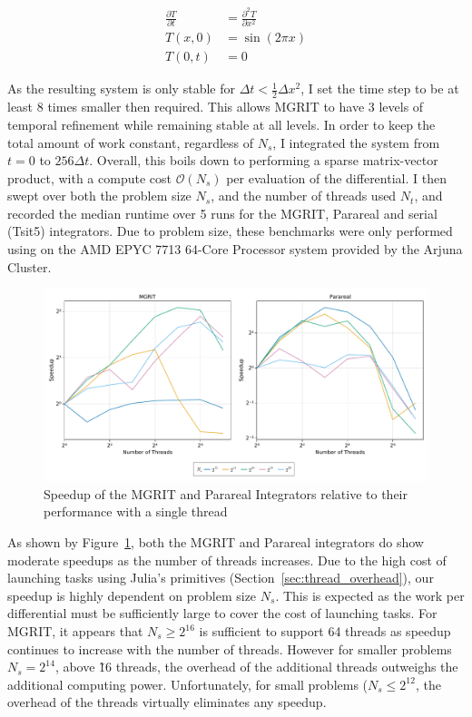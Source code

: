 \documentclass{article}
\begin{document}
\begin{equation}\label{eq:heat}
    \begin{align*}
        \frac{\partial T}{\partial t} &= \frac{\partial^2 T}{\partial x^2} \\
        T(x, 0) &= \sin(2 \pi x) \\
        T(0, t) &= 0
    \end{align*}
\end{equation}

As the resulting system is only stable for \(\Delta t < \frac{1}{2} \Delta x^2\), I set the time step to be at least 8 times smaller then required.
This allows MGRIT to have 3 levels of temporal refinement while remaining stable at all levels.
In order to keep the total amount of work constant, regardless of \(N_s\), I integrated the system from \(t = 0\) to \(256 \Delta t\).
Overall, this boils down to performing a sparse matrix-vector product, with a compute cost \(\mathcal{O}(N_s) \) per evaluation of the differential.
I then swept over both the problem size \(N_s\), and the number of threads used \(N_t\), and recorded the median runtime over 5 runs for the MGRIT, Parareal and serial (Tsit5) integrators.
Due to problem size, these benchmarks were only performed using on the AMD EPYC 7713 64-Core Processor system provided by the Arjuna Cluster.

\begin{figure}[h!]
    \centering
    \includegraphics[width=\linewidth]{docs/assets/speedup_serial.pdf}
    \caption{Speedup of the MGRIT and Parareal Integrators relative to their performance with a single thread}
    \label{fig:heat_bench}
\end{figure}

As shown by Figure~\ref{fig:heat_bench}, both the MGRIT and Parareal integrators do show moderate speedups as the number of threads increases.
Due to the high cost of launching tasks using Julia's primitives (Section~\ref{sec:thread_overhead}), our speedup is highly dependent on problem size \(N_s\).
This is expected as the work per differential must be sufficiently large to cover the cost of launching tasks.
For MGRIT, it appears that \(N_s \geq 2^{16}\) is sufficient to support 64 threads as speedup continues to increase with the number of threads.
However for smaller problems \(N_s = 2^{14}\), above \~16 threads, the overhead of the additional threads outweighs the additional computing power.
Unfortunately, for small problems (\(N_s \leq 2^{12}\), the overhead of the threads virtually eliminates any speedup.
\end{document}
